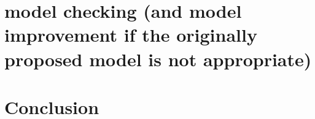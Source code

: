 \documentclass[12pt,notitlepage]{article}
\begin{document}
\section{model checking (and model improvement if the originally proposed model is not appropriate)}






\section{Conclusion}






\pagebreak

%
%
\end{document}
